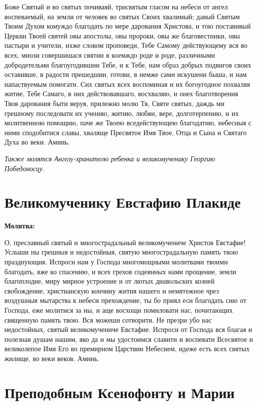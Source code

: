 Боже Святый и во святых почиваяй, трисвятым гласом на небеси от ангел воспеваемый, на земли от человек во святых Своих хвалимый; давый Святым Твоим Духом комуждо благодать по мере дарования Христова, и тою поставивый Церкви Твоей святей овы апостолы, овы пророки, овы же благовестники, овы пастыри и учители, ихже словом проповеди, Тебе Самому действующему вся во всех, мнози совершишася святии в коемждо роде и роде, различными добродетельми благоугодившии Тебе, и к Тебе, нам образ добрых подвигов своих оставивше, в радости прешедшии, готови, в немже сами искушени быша, и нам напаствуемым помогати. Сих святых всех воспоминая и их богоугодное похваляя житие, Тебе Самаго, в них действовавшаго, восхваляю, и онех благотворения Твоя дарования быти веруя, прилежно молю Тя, Святе святых, даждь ми грешному последовати их учению, житию, любви, вере, долготерпению, и их молитвенною помощию, паче же Твоею вседействующею благодатию, небесныя с ними сподобитися славы, хваляще Пресвятое Имя Твое, Отца и Сына и Святаго Духа во веки. Аминь.

\itshape Также молятся Ангелу-хранителю ребенка и великомученику Георгию Победоносцу.

\normalfont{} 


\section{Великомученику Евстафию Плакиде}
 


\bfseries Молитва:\normalfont{}


О, преславный святый и многострадальный великомучениче Христов Евстафие! Услыши ны грешныя и недостойныя, святую многострадальную память твою празднующия. Испроси нам у Господа многомощными молитвами твоими благодать, яже ко спасению, и всех грехов содеянных нами прощение, земли благоплодие, миру мирное устроение и от лютых диавольских козней свобождение, христианскую кончину жития нашего и немятежное чрез воздушныя мытарства к небеси прехождение, ты бо приял еси благодать сию от Господа, еже молитися за ны, и аще восхощи помиловати нас, почитающих священную память твою. Вся можеши сотворити. Не презри убо нас недостойных, святый великомучениче Евстафие. Испроси от Господа вся благая и полезная душам нашим, яко да и мы удостоимся славити и воспевати Всесвятое и великолепое Имя Его во премирном Царствии Небеснем, идеже есть всех святых жилище, во веки веков. Аминь. 


\section{Преподобным Ксенофонту и Марии}
 

